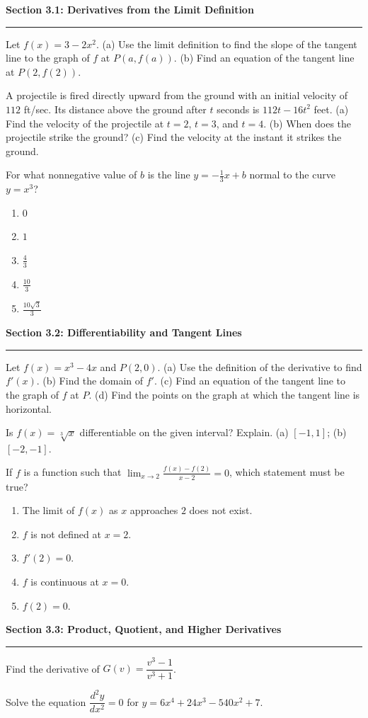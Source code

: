 \documentclass[11pt]{article}
\newcommand{\wsS}{\vspace*{2.0cm}}
\newcommand{\wsM}{\vspace*{3.1cm}}
\newcommand{\wsL}{\vspace*{5.0cm}}
\newcommand{\prob}[1]{\item[\textbf{#1}]}
\newcommand{\choices}[5]{\begin{enumerate}[label=\textbf{(\Alph*)},leftmargin=2.4em,itemsep=1pt,topsep=4pt]\item #1\item #2\item #3\item #4\item #5\end{enumerate}}
\newcommand{\topicdivider}[2]{%
  \Needspace{11.5cm}%
  \par\medskip
  \noindent\textbf{Section #1: #2}\par
  \vspace{0.25em}
  \noindent\rule{\linewidth}{0.6pt}\par
  \medskip
}
\begin{document}
\topicdivider{3.1}{Derivatives from the Limit Definition}
\Needspace{7cm}
\begin{probs}
\prob{16.} Let $f(x)=3-2x^2$. (a) Use the limit definition to find the slope of the tangent line to the graph of $f$ at $P(a,f(a))$. (b) Find an equation of the tangent line at $P(2,f(2))$. \wsM
\end{probs}
\Needspace{10cm}
\begin{probs}
\prob{17.} A projectile is fired directly upward from the ground with an initial velocity of $112$ ft/sec. Its distance above the ground after $t$ seconds is $112t-16t^2$ feet. (a) Find the velocity of the projectile at $t=2$, $t=3$, and $t=4$. (b) When does the projectile strike the ground? (c) Find the velocity at the instant it strikes the ground. \wsL
\end{probs}
\Needspace{7cm}
\begin{probs}
\prob{18.} For what nonnegative value of $b$ is the line $y=-\frac13x+b$ normal to the curve $y=x^3$?\choices{$0$}{$1$}{$\frac43$}{$\frac{10}{3}$}{$\frac{10\sqrt3}{3}$} \wsM
\end{probs}
\topicdivider{3.2}{Differentiability and Tangent Lines}
\Needspace{10cm}
\begin{probs}
\prob{19.} Let $f(x)=x^3-4x$ and $P(2,0)$. (a) Use the definition of the derivative to find $f'(x)$. (b) Find the domain of $f'$. (c) Find an equation of the tangent line to the graph of $f$ at $P$. (d) Find the points on the graph at which the tangent line is horizontal. \wsL
\end{probs}
\Needspace{7cm}
\begin{probs}
\prob{20.} Is $f(x)=\sqrt[3]{x}$ differentiable on the given interval? Explain. (a) $[-1,1]$; (b) $[-2,-1]$. \wsM
\end{probs}
\Needspace{5.5cm}
\begin{probs}
\prob{21.} If $f$ is a function such that $\displaystyle\lim_{x\to2}\frac{f(x)-f(2)}{x-2}=0$, which statement must be true?\choices{The limit of $f(x)$ as $x$ approaches $2$ does not exist.}{$f$ is not defined at $x=2$.}{$f'(2)=0$.}{$f$ is continuous at $x=0$.}{$f(2)=0$.} \wsS
\end{probs}
\topicdivider{3.3}{Product, Quotient, and Higher Derivatives}
\Needspace{7cm}
\begin{probs}
\prob{22.} Find the derivative of $G(v)=\dfrac{v^3-1}{v^3+1}$. \wsM
\end{probs}
\Needspace{7cm}
\begin{probs}
\prob{23.} Solve the equation $\dfrac{d^2y}{dx^2}=0$ for $y=6x^4+24x^3-540x^2+7$. \wsM
\end{probs}
\end{document}

